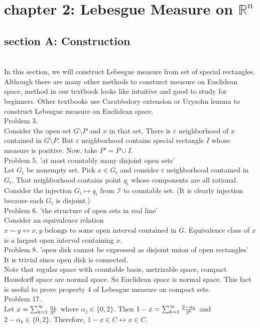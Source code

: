 \section*{chapter 2: Lebesgue Measure on $\mathbb{R}^n$}
\subsection*{section A: Construction}\hfill \\

In this section, we will construct Lebesgue measure from set of special rectangles. Although there are many other methods to consturct measure on Euclidean space, method in our textbook looks like intuitive and good to study for beginners. Other textbooks use Caratéodory extension or Urysohn lemma to construct Lebesgue measure on Euclidean space. \\

Problem 3. \\

Consider the open set $G \setminus P$ and $x$ in that set. There is $\varepsilon$ neighborhood of $x$ contained in $G \setminus P$. But $\varepsilon$ neighborhood contains special rectangle $I$  whose measure is positive. Now, take $P' = P \cup I$.\\

Problem 5. 'at most countably many disjoint open sets'\\

Let $G_i$ be nonempty set. Pick $x \in G_i$ and consider $\varepsilon$ neighborhood contained in $G_i$. That neighborhood contains point $q_i$  whose components are all rational. Consider the injection $G_i \mapsto q_i$ from $\mathcal{I}$ to countable set. (It is clearly injection because each $G_i$ is disjoint.)\\

Problem 6. 'the structure of open sets in real line' \\

Consider an equivalence relation $x \sim y \leftrightarrow x, y \text{ belongs to some open interval contained in }G$. Equivalence class of $x$ is a largest open interval containing $x$.\\

Problem 8. 'open disk cannot be expressed as disjoint union of open rectangles'\\

It is trivial since open disk is connected.\\

Note that regular space with countable basis, metrizable space, compact Hausdorff space are normal space. So Euclidean space is normal space. This fact is useful to prove property 4 of Lebesgue measure on compact sets.\\

Problem 17. \\

Let $x = \sum_{k=1} ^ \infty {\alpha_k \over 3^k} $ where $\alpha_j \in \{ 0, 2\} $. Then $1-x = \sum_{k=1}^\infty {2 - \alpha_k \over 3^k } $ and $2-\alpha_k \in \{ 0, 2 \}$. Therefore, $1-x \in C \leftrightarrow x\in C$.\\



